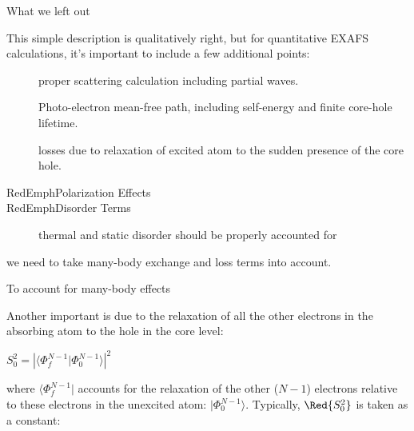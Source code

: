\begin{slide}{What we left out}
  \vmm
    
    This simple description is qualitatively right, but for quantitative
    EXAFS calculations, it's important to include a few additional points:
    
    \begin{description}
    \item[] proper scattering calculation
      including partial waves.
      
    \item[] Photo-electron mean-free path,
      including self-energy and finite core-hole lifetime.
      
    \item[] losses due to relaxation of excited
      atom to the sudden presence of the core hole.
      
    \item[] 

    \item[RedEmph{Polarization Effects}] 


    \item[RedEmph{Disorder Terms}]  thermal and static disorder should be
    properly accounted for
      
    \end{description}

    we need to take many-body exchange
    and loss terms into account.


    To account for many-body effects



    Another important {} is due to the relaxation
    of all the other electrons in the absorbing atom to the hole in the
    core level:

    \vspace{3mm}

    { \begin{center}
     $
     {\displaystyle
       S_0^2 =  {  |{\langle \Phi^{N-1}_f |\Phi^{N-1}_0 \rangle}|^2 }  }     $
     \end{center}
     }
     \vspace{1mm}
     
     where ${\langle \Phi^{N-1}_f|}$ accounts for the relaxation of
     the other ($N-1$) electrons relative to these electrons in the
     unexcited atom: ${| \Phi^{N-1}_0 \rangle }$.
     Typically, $\Red{S_0^2}$ is taken as a constant:


\end{slide}
